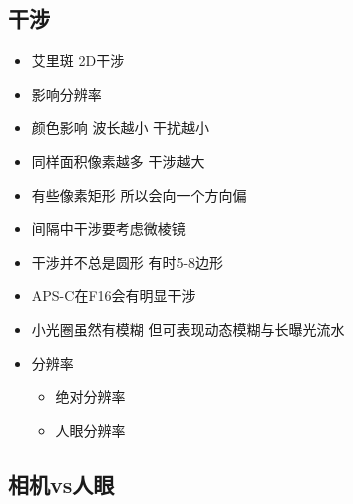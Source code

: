 \documentclass[
  letterpaper,
  DIV=11,
  numbers=noendperiod]{scrreprt}
\providecommand{\tightlist}{%
  \setlength{\itemsep}{0pt}\setlength{\parskip}{0pt}}\usepackage{longtable,booktabs,array}
\begin{document}
\subsection{干涉}\label{ux5e72ux6d89}

\begin{itemize}
\tightlist
\item
  艾里斑 2D干涉
\item
  影响分辨率
\item
  颜色影响 波长越小 干扰越小
\item
  同样面积像素越多 干涉越大
\item
  有些像素矩形 所以会向一个方向偏
\item
  间隔中干涉要考虑微棱镜
\item
  干涉并不总是圆形 有时5-8边形
\item
  APS-C在F16会有明显干涉
\item
  小光圈虽然有模糊 但可表现动态模糊与长曝光流水
\item
  分辨率

  \begin{itemize}
  \tightlist
  \item
    绝对分辨率
  \item
    人眼分辨率
  \end{itemize}
\end{itemize}

\subsection{相机vs人眼}\label{ux76f8ux673avsux4ebaux773c}
\end{document}
